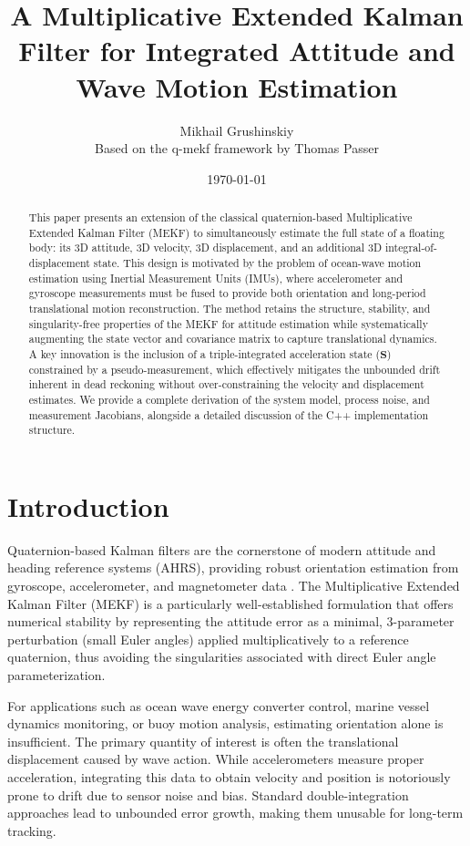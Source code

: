 \documentclass[11pt]{article}
\title{A Multiplicative Extended Kalman Filter for Integrated Attitude and Wave Motion Estimation}
\author{Mikhail Grushinskiy \\ Based on the q-mekf framework by Thomas Passer}
\date{\today}
\begin{document}
\maketitle

\begin{abstract}
This paper presents an extension of the classical quaternion-based Multiplicative Extended Kalman Filter (MEKF) to simultaneously estimate the full state of a floating body: its 3D attitude, 3D velocity, 3D displacement, and an additional 3D integral-of-displacement state. This design is motivated by the problem of ocean-wave motion estimation using Inertial Measurement Units (IMUs), where accelerometer and gyroscope measurements must be fused to provide both orientation and long-period translational motion reconstruction. The method retains the structure, stability, and singularity-free properties of the MEKF for attitude estimation while systematically augmenting the state vector and covariance matrix to capture translational dynamics. A key innovation is the inclusion of a triple-integrated acceleration state ($\bm{S}$) constrained by a pseudo-measurement, which effectively mitigates the unbounded drift inherent in dead reckoning without over-constraining the velocity and displacement estimates. We provide a complete derivation of the system model, process noise, and measurement Jacobians, alongside a detailed discussion of the C++ implementation structure.
\end{abstract}

\section{Introduction}
\label{sec:introduction}
Quaternion-based Kalman filters are the cornerstone of modern attitude and heading reference systems (AHRS), providing robust orientation estimation from gyroscope, accelerometer, and magnetometer data \cite{crassidis2007survey, markley2003attitude}. The Multiplicative Extended Kalman Filter (MEKF) is a particularly well-established formulation that offers numerical stability by representing the attitude error as a minimal, 3-parameter perturbation (small Euler angles) applied multiplicatively to a reference quaternion, thus avoiding the singularities associated with direct Euler angle parameterization.

For applications such as ocean wave energy converter control, marine vessel dynamics monitoring, or buoy motion analysis, estimating orientation alone is insufficient. The primary quantity of interest is often the translational displacement caused by wave action. While accelerometers measure proper acceleration, integrating this data to obtain velocity and position is notoriously prone to drift due to sensor noise and bias. Standard double-integration approaches lead to unbounded error growth, making them unusable for long-term tracking.
\end{document}
